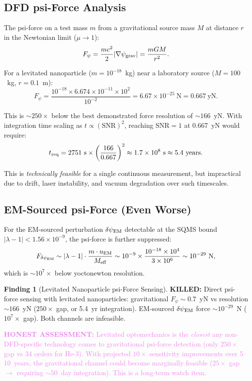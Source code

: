 \documentclass[11pt]{article}
\theoremstyle{definition}
\newtheorem{finding}[theorem]{Finding}
\theoremstyle{remark}
\newcommand{\ee}[1]{\times 10^{#1}}
\newcommand{\dpsi}{\delta\psi_{\rm EM}}
\newcommand{\lam}{|\lambda-1|}
\newcommand{\SNR}{\mathrm{SNR}}
\newcommand{\honest}[1]{\textcolor{violet}{\textbf{HONEST ASSESSMENT:} #1}}
\newcommand{\killed}[1]{\textcolor{red!70!black}{\textbf{KILLED:} #1}}
\begin{document}
\subsection{DFD psi-Force Analysis}

The psi-force on a test mass $m$ from a gravitational source mass
$M$ at distance $r$ in the Newtonian limit ($\mu \to 1$):
\begin{equation}
F_\psi = \frac{mc^2}{2}|\nabla\psi_{\rm grav}|
= \frac{mGM}{r^2}.
\label{eq:f_psi_grav}
\end{equation}

For a levitated nanoparticle ($m = 10^{-18}$~kg) near a laboratory
source ($M = 100$~kg, $r = 0.1$~m):
\begin{equation}
F_\psi = \frac{10^{-18} \times 6.674\ee{-11} \times 10^2}{10^{-2}}
= 6.67\ee{-25}~\text{N} = 0.667~\text{yN}.
\label{eq:f_psi_num}
\end{equation}

This is $\sim 250\times$ below the best demonstrated force resolution
of $\sim 166$~yN. With integration time scaling as $t \propto
(\SNR)^2$, reaching $\SNR = 1$ at 0.667~yN would require:
\begin{equation}
t_{\rm req} = 2751~{\rm s} \times \left(\frac{166}{0.667}\right)^2
\approx 1.7\ee{8}~{\rm s} \approx 5.4~{\rm years}.
\label{eq:t_req}
\end{equation}

This is \textit{technically feasible} for a single continuous
measurement, but impractical due to drift, laser instability, and
vacuum degradation over such timescales.

\subsection{EM-Sourced psi-Force (Even Worse)}

For the EM-sourced perturbation $\dpsi$ detectable at the SQMS
bound $\lam < 1.56\ee{-9}$, the psi-force is further suppressed:
\begin{equation}
F_{\dpsi} \sim \lam \cdot \frac{m \cdot u_{\rm EM}}{M_{\rm eff}}
\sim 10^{-9} \times \frac{10^{-18} \times 10^4}{3\ee{6}}
\sim 10^{-29}~\text{N},
\label{eq:f_dpsi}
\end{equation}
which is $\sim 10^7 \times$ below yoctonewton resolution.

\begin{finding}[Levitated Nanoparticle psi-Force Sensing]
\label{find:levitated}
\killed{Direct psi-force sensing with levitated nanoparticles:
gravitational $F_\psi \sim 0.7$~yN vs resolution $\sim 166$~yN
($250\times$ gap, or 5.4~yr integration). EM-sourced $\dpsi$ force
$\sim 10^{-29}$~N ($10^7\times$ gap). Both channels are infeasible.}

\honest{Levitated optomechanics is the \textit{closest} any
non-DFD-specific technology comes to gravitational psi-force
detection (only $250\times$ gap vs $34$ orders for He-3). With
projected $10\times$ sensitivity improvements over 5--10~years,
the gravitational channel could become marginally feasible
($25\times$ gap $\to$ requiring $\sim 50$~day integration).
This is a long-term watch item.}
\end{finding}
\end{document}
